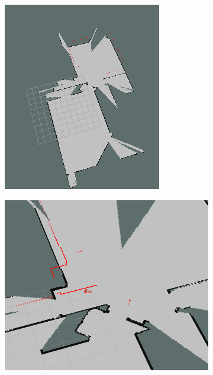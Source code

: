 \documentclass[a4paper, 10pt]{IEEEconf}
\begin{document}
\begin{figure}[H]
\begin{subfigure}[b]{0.4\textwidth}
  	\includegraphics[width=\textwidth]{images/pgm}
  	\label{fig:using the 2D map saved to the pgm file and updated the the navigation stack from the map server the robot can show the path and position to each waypoint}
\end{subfigure}
\hfill
\begin{subfigure}[b]{0.57\textwidth}
  	\includegraphics[width=\textwidth]{images/mapping}
  	\label{fig:Rviz showing the mapping of the robot}
\end{subfigure}
\end{figure}
\end{document}
